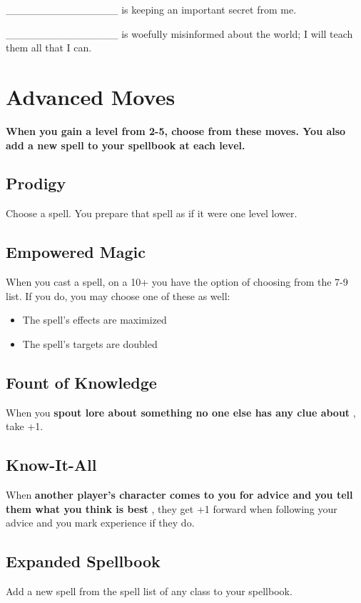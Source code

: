 \_\_\_\_\_\_\_\_\_\_\_\_\_\_\_ is keeping an important secret from me.

\_\_\_\_\_\_\_\_\_\_\_\_\_\_\_ is woefully misinformed about the world; I will teach them all that I can.
\section*{Advanced Moves}

{\bfseries When you gain a level from 2-5, choose from these moves. You also add a new spell to your spellbook at each level.}
\subsection{Prodigy}

Choose a spell. You prepare that spell as if it were one level lower.
\subsection{Empowered Magic}

When you cast a spell, on a 10+ you have the option of choosing from the 7-9 list. If you do, you may choose one of these as well:
\begin{itemize}
\item The spell's effects are maximized
\item The spell's targets are doubled

\end{itemize}
\subsection{Fount of Knowledge}

When you \textbf{spout lore about something no one else has any clue about}
, take +1.
\subsection{Know-It-All}

When \textbf{another player's character comes to you for advice and you tell them what you think is best}
, they get +1 forward when following your advice and you mark experience if they do.
\subsection{Expanded Spellbook}

Add a new spell from the spell list of any class to your spellbook.
